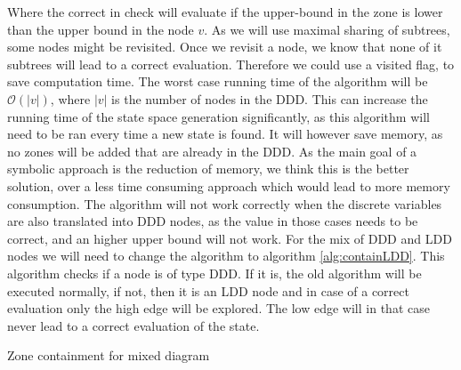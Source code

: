 \documentclass[11pt]{article}
\begin{document}
Where the correct in check will evaluate if the upper-bound in the zone is lower than the upper bound in the node $v$. As we will use maximal sharing of subtrees, some nodes might be revisited. Once we revisit a node, we know that none of it subtrees will lead to a correct evaluation. Therefore we could use a visited flag, to save computation time. The worst case running time of the algorithm will be $\mathcal{O}(|v|)$, where $|v|$ is the number of nodes in the DDD. This can increase the running time of the state space generation significantly, as this algorithm will need to be ran every time a new state is found. It will however save memory, as no zones will be added that are already in the DDD. As the main goal of a symbolic approach is the reduction of memory, we think this is the better solution, over a less time consuming approach which would lead to more memory consumption. The algorithm will not work correctly when the discrete variables are also translated into DDD nodes, as the value in those cases needs to be correct, and an higher upper bound will not work. For the mix of DDD and LDD nodes we will need to change the algorithm to algorithm \ref{alg:containLDD}. This algorithm checks if a node is of type DDD. If it is, the old algorithm will be executed normally, if not, then it is an LDD node and in case of a correct evaluation only the high edge will be explored. The low edge will in that case never lead to a correct evaluation of the state.

\begin{algorithm}
\begin{algorithmic}[1]
\caption{Zone containment for mixed diagram}\label{alg:containLDD}
	\EndIf
				\Return{\True}
			\EndIf
		\EndIf 
	\EndIf
\EndProcedure
\end{algorithmic}
\end{algorithm}
\end{document}
